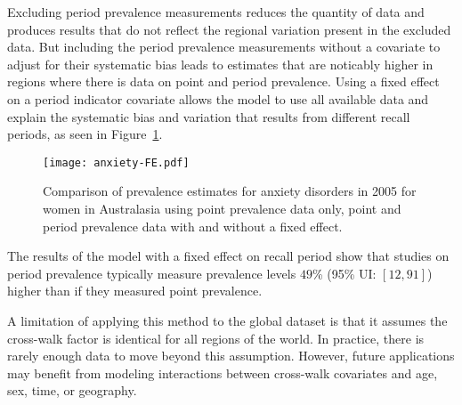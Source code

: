Excluding period prevalence measurements reduces the quantity of data
and produces results that do not reflect the regional variation
present in the excluded data.  But including the period prevalence
measurements without a covariate to adjust for their systematic bias
leads to estimates that are noticably higher in regions where there is
data on point and period prevalence.  Using a fixed effect on a period
indicator covariate allows the model to use all available data and
explain the systematic bias and variation that results from different
recall periods, as seen in Figure~\ref{fig:app-anxiety FE}.

    \begin{figure}[h]
        \begin{center}
            \texttt{[image: anxiety-FE.pdf]}
            \caption{Comparison of prevalence estimates for anxiety
              disorders in 2005 for women in Australasia using point
              prevalence data only, point and period prevalence data
              with and without a fixed effect.}
            \label{fig:app-anxiety FE}
        \end{center}
    \end{figure}

The results of the model with a fixed effect on recall period show
that studies on period prevalence typically measure prevalence levels
$49$\% (95\% UI: $[12, 91]$) higher than if they measured point
prevalence.

A limitation of applying this method to the global dataset is that it
assumes the cross-walk factor is identical for all regions of the
world.  In practice, there is rarely enough data to move beyond this
assumption.  However, future applications may benefit from modeling
interactions between cross-walk covariates and age, sex, time, or
geography.
